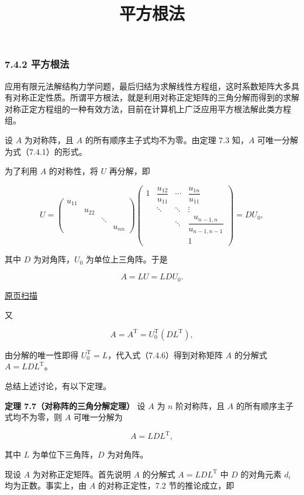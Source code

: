 \documentclass[
  10pt,
  fontset=fandol]{ctexart}
\title{平方根法}
\author{}
\date{}
\begin{document}
\maketitle

\subsubsection{7.4.2 平方根法}\label{ux5e73ux65b9ux6839ux6cd5}

应用有限元法解结构力学问题，最后归结为求解线性方程组，这时系数矩阵大多具有对称正定性质。所谓平方根法，就是利用对称正定矩阵的三角分解而得到的求解对称正定方程组的一种有效方法，目前在计算机上广泛应用平方根法解此类方程组。

设 \(A\) 为对称阵，且 \(A\) 的所有顺序主子式均不为零。由定理 7.3 知，\(A\) 可唯一分解为式（7.4.1）的形式。

为了利用 \(A\) 的对称性，将 \(U\) 再分解，即

\[
U=\begin{pmatrix}
u_{11}&&&\\
&u_{22}&&\\
&&\ddots&\\
&&&u_{nn}
\end{pmatrix}
\begin{pmatrix}
1&\dfrac{u_{12}}{u_{11}}&\cdots&\dfrac{u_{1n}}{u_{11}}\\
&\ddots&\ddots&\vdots\\
&&\ddots&\dfrac{u_{n-1,n}}{u_{n-1,n-1}}\\
&&&1
\end{pmatrix}=DU_0,
\]

其中 \(D\) 为对角阵，\(U_0\) 为单位上三角阵。于是

\[A=LU=LDU_0.\tag{7.4.6}\]

\href{../../source-images/pdf-195.jpeg}{原页扫描}

又

\[A=A^{\mathrm T}=U_0^{\mathrm T}(DL^{\mathrm T}),\]

由分解的唯一性即得 \(U_0^{\mathrm T}=L\)，代入式（7.4.6）得到对称矩阵 \(A\) 的分解式 \(A=LDL^{\mathrm T}\)。

总结上述讨论，有以下定理。

\textbf{定理 7.7（对称阵的三角分解定理）} 设 \(A\) 为 \(n\) 阶对称阵，且 \(A\) 的所有顺序主子式均不为零，则 \(A\) 可唯一分解为

\[A=LDL^{\mathrm T},\]

其中 \(L\) 为单位下三角阵，\(D\) 为对角阵。

现设 \(A\) 为对称正定矩阵。首先说明 \(A\) 的分解式 \(A=LDL^{\mathrm T}\) 中 \(D\) 的对角元素 \(d_i\) 均为正数。事实上，由 \(A\) 的对称正定性，7.2 节的推论成立，即
\end{document}
